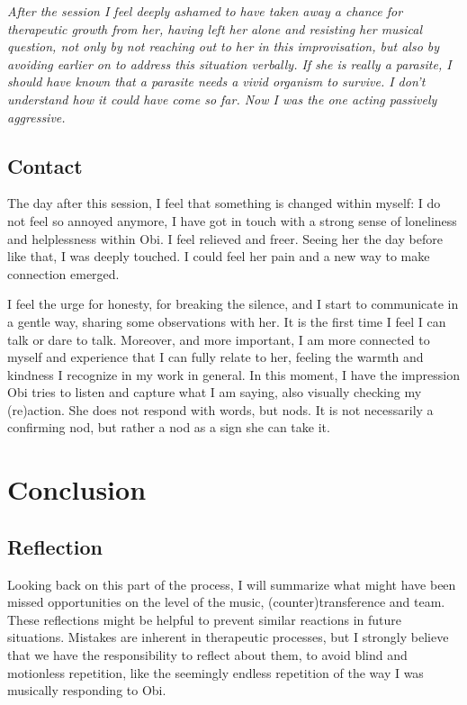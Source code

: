 \documentclass[authordate, empirical]{jote-new-article}
\begin{document}
{\emph{After the session I feel deeply ashamed to have taken away a chance for therapeutic growth from her, having left her alone and resisting her musical question, not only by not reaching out to her in this improvisation, but also by avoiding earlier on to address this situation verbally. If she is really a parasite, I should have known that a parasite needs a vivid organism to survive. I don't understand how it could have come so far. Now I was the one acting passively aggressive. }}




\subsection{Contact}



The day after this session, I feel that something is changed within myself: I do not feel so annoyed anymore, I have got in touch with a strong sense of loneliness and helplessness within Obi. I feel relieved and freer. Seeing her the day before like that, I was deeply touched. I could feel her pain and a new way to make connection emerged.



I feel the urge for honesty, for breaking the silence, and I start to communicate in a gentle way, sharing some observations with her. It is the first time I feel I can talk or dare to talk. Moreover, and more important, I am more connected to myself and experience that I can fully relate to her, feeling the warmth and kindness I recognize in my work in general. In this moment, I have the impression Obi tries to listen and capture what I am saying, also visually checking my (re)action. She does not respond with words, but nods. It is not necessarily a confirming nod, but rather a nod as a sign she can take it.


\section{Conclusion}

\subsection{Reflection}



Looking back on this part of the process, I will summarize what might have been missed opportunities on the level of the music, (counter)transference and team. These reflections might be helpful to prevent similar reactions in future situations. Mistakes are inherent in therapeutic processes, but I strongly believe that we have the responsibility to reflect about them, to avoid blind and motionless repetition, like the seemingly endless repetition of the way I was musically responding to Obi.
\end{document}

